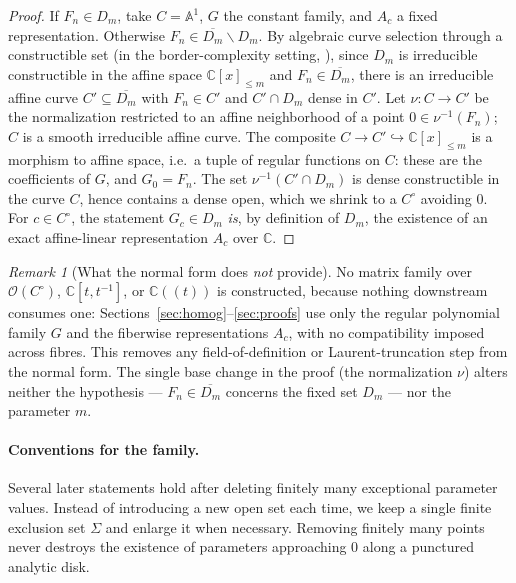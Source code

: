 \documentclass[acmsmall,screen,nonacm]{acmart}
\theoremstyle{definition}
\theoremstyle{remark}
\newtheorem{remark}{Remark}[section]
\newcommand{\CC}{\mathbb{C}}
\newcommand{\AAff}{\mathbb{A}}
\newcommand{\OO}{\mathcal{O}}
\begin{document}
\begin{proof}
If $F_n\in D_m$, take $C=\AAff^1$, $G$ the constant family, and
$A_c$ a fixed representation.  Otherwise
$F_n\in\overline{D_m}\smallsetminus D_m$.  By algebraic curve
selection through a constructible set
\cite[I.10]{Mumford99} (in the border-complexity setting,
\cite[\S20.6]{Buergisser00}), since $D_m$ is irreducible constructible
in the affine space $\CC[x]_{\le m}$ and $F_n\in\overline{D_m}$, there
is an irreducible affine curve $C'\subseteq\overline{D_m}$ with
$F_n\in C'$ and $C'\cap D_m$ dense in $C'$.  Let $\nu:C\to C'$ be the
normalization restricted to an affine neighborhood of a point
$0\in\nu^{-1}(F_n)$; $C$ is a smooth irreducible affine curve.  The
composite $C\to C'\hookrightarrow\CC[x]_{\le m}$ is a morphism to
affine space, i.e.\ a tuple of regular functions on $C$: these are the
coefficients of $G$, and $G_0=F_n$.  The set $\nu^{-1}(C'\cap D_m)$ is
dense constructible in the curve $C$, hence contains a dense open,
which we shrink to a $C^\circ$ avoiding $0$.  For $c\in C^\circ$, the
statement $G_c\in D_m$ \emph{is}, by definition of $D_m$, the
existence of an exact affine-linear representation $A_c$ over $\CC$.
\end{proof}

\begin{remark}[What the normal form does \emph{not} provide]
\label{rem:fiberwise}
No matrix family over $\OO(C^\circ)$, $\CC[t,t^{-1}]$, or
$\CC((t))$ is constructed, because nothing downstream consumes one:
Sections~\ref{sec:homog}--\ref{sec:proofs} use only the regular
polynomial family $G$ and the fiberwise representations $A_c$, with no
compatibility imposed across fibres.  This removes any
field-of-definition or Laurent-truncation step from the normal form.
The single base change in the proof (the normalization $\nu$) alters
neither the hypothesis --- $F_n\in\overline{D_m}$ concerns the fixed
set $D_m$ --- nor the parameter $m$.
\end{remark}

\paragraph{Conventions for the family.}
Several later statements hold after deleting finitely many exceptional
parameter values.  Instead of introducing a new open set each time, we keep a
single finite exclusion set $\Sigma$ and enlarge it when necessary.  Removing
finitely many points never destroys the existence of parameters approaching
$0$ along a punctured analytic disk.
\end{document}
